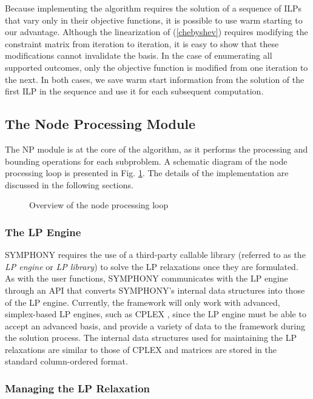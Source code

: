 Because implementing the algorithm requires the solution of a sequence of
ILPs that vary only in their objective functions, it is possible to use warm
starting to our advantage.  Although the linearization of (\ref{chebyshev})
requires modifying the constraint matrix from iteration to iteration, it is
easy to show that these modifications cannot invalidate the basis. In the case
of enumerating all supported outcomes, only the objective function is modified
from one iteration to the next. In both cases, we save warm start information
from the solution of the first ILP in the sequence and use it for each
subsequent computation.

\subsection{The Node Processing Module}

The NP module is at the core of the algorithm, as it performs the
processing and bounding operations for each subproblem. A schematic
diagram of the node processing loop is presented in Fig. \ref{LP-loop}.
The details of the implementation are discussed in the following
sections. 

\begin{figure}
\centering
{}
\caption{Overview of the node processing loop}
\label{LP-loop}
\end{figure}

\subsubsection{The LP Engine}

SYMPHONY requires the use of a third-party callable library (referred
to as the {\em LP engine} or {\em LP library}) to solve the LP
relaxations once they are formulated. As with the user functions,
SYMPHONY communicates with the LP engine through an API that converts
SYMPHONY's internal data structures into those of the LP engine.
Currently, the framework will only work with advanced, simplex-based
LP engines, such as CPLEX \cite{cplex}, since the LP engine must be
able to accept an advanced basis, and provide a variety of data to the
framework during the solution process. The internal data structures
used for maintaining the LP relaxations are similar to those of CPLEX
and matrices are stored in the standard column-ordered format.

\subsubsection{Managing the LP Relaxation}
\label{lp-relaxation}


